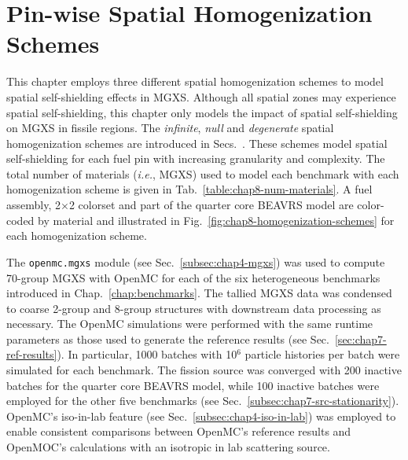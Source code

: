 \section{Pin-wise Spatial Homogenization Schemes}
\label{sec:chap8-pinwise-space-homogenize}

This chapter employs three different spatial homogenization schemes to model spatial self-shielding effects in \ac{MGXS}. Although all spatial zones may experience spatial self-shielding, this chapter only models the impact of spatial self-shielding on \ac{MGXS} in fissile regions. The \textit{infinite}, \textit{null} and \textit{degenerate} spatial homogenization schemes are introduced in Secs.~. These schemes model spatial self-shielding for each fuel pin with increasing granularity and complexity. The total number of materials (\textit{i.e.}, \ac{MGXS}) used to model each benchmark with each homogenization scheme is given in Tab.~\ref{table:chap8-num-materials}. A fuel assembly, 2$\times$2 colorset and part of the quarter core \ac{BEAVRS} model are color-coded by material and illustrated in Fig.~\ref{fig:chap8-homogenization-schemes} for each homogenization scheme.

The \texttt{openmc.mgxs} module (see Sec.~\ref{subsec:chap4-mgxs}) was used to compute 70-group \ac{MGXS} with OpenMC for each of the six heterogeneous benchmarks introduced in Chap.~\ref{chap:benchmarks}. The tallied \ac{MGXS} data was condensed to coarse 2-group and 8-group structures with downstream data processing as necessary. The OpenMC simulations were performed with the same runtime parameters as those used to generate the reference results (see Sec.~\ref{sec:chap7-ref-results}). In particular, 1000 batches with 10$^{6}$ particle histories per batch were simulated for each benchmark. The fission source was converged with 200 inactive batches for the quarter core \ac{BEAVRS} model, while 100 inactive batches were employed for the other five benchmarks (see Sec.~\ref{subsec:chap7-src-stationarity}). OpenMC's iso-in-lab feature (see Sec.~\ref{subsec:chap4-iso-in-lab}) was employed to enable consistent comparisons between OpenMC's reference results and OpenMOC's calculations with an isotropic in lab scattering source.

